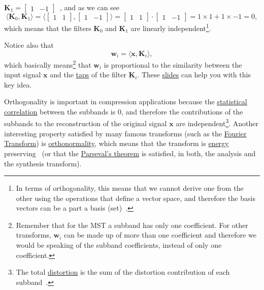 ${\mathbf K}_1=\begin{bmatrix} 1 & -1\end{bmatrix}$~, and as we can
see
\begin{equation}
  \langle {\mathbf K}_0,{\mathbf K}_1 \rangle =
  \langle \begin{bmatrix}
    1 & 1
  \end{bmatrix}
  ,
  \begin{bmatrix}
    1 & -1
  \end{bmatrix}
  \rangle =
  \begin{bmatrix}
    1 & 1
  \end{bmatrix}
  \cdot
  \begin{bmatrix}
    1 & -1
  \end{bmatrix}
   = 1\times 1 + 1\times -1 = 0,
\end{equation}
which means that the filters ${\mathbf K}_0$ and ${\mathbf K}_1$ are linearly
independent\footnote{In terms of orthogonality, this means that we
  cannot derive one from the other using the operations that define a
  vector space, and therefore the basis vectors can be a part a basis
  (set)~\cite{strang4linear}.}.

Notice also that
\begin{equation}
  {\mathbf w}_i = \langle {\mathbf x}, {\mathbf K}_i\rangle,
\end{equation}
which basically means\footnote{Remember that for the MST a subband has
  only one coefficient. For other transforms, ${\mathbf w}_i$ can be
  made up of more than one coefficient and therefore we would be
  speaking of the subband coefficients, instead of only one
  coefficient.} that ${\mathbf w}_i$ is proportional to the similarity
between the input signal ${\mathbf x}$ and the
\href{https://en.wikipedia.org/wiki/Finite_impulse_response}{taps} of
the filter ${\mathbf K}_i$. These
\href{https://cseweb.ucsd.edu/classes/fa17/cse166-a/lec13.pdf}{slides}
can help you with this key idea.

Orthogonality is important in compression applications because the
\href{https://en.wikipedia.org/wiki/Correlation_and_dependence}{statistical
  correlation} between the subbands is 0, and therefore the
contributions of the subbands to the reconstruction of the original
signal ${\mathbf x}$ are independent\footnote{The total
  \href{https://en.wikipedia.org/wiki/Distortion}{distortion} is the
  sum of the distortion contribution of each
  subband~\cite{sayood2017introduction}.}. Another interesting
property satisfied by many famous transforms (such as the
\href{https://en.wikipedia.org/wiki/Fourier_transform}{Fourier
  Transform}) is
\href{https://en.wikipedia.org/wiki/Orthonormality}{orthonormality},
which means that the transform is
\href{https://en.wikipedia.org/wiki/Energy_(signal_processing)}{energy}
preserving~\cite{sayood2017introduction} (or that the
\href{https://en.wikipedia.org/wiki/Parseval%27s_theorem}{Parseval's
  theorem} is satisfied, in both, the analysis and the synthesis
transform).

